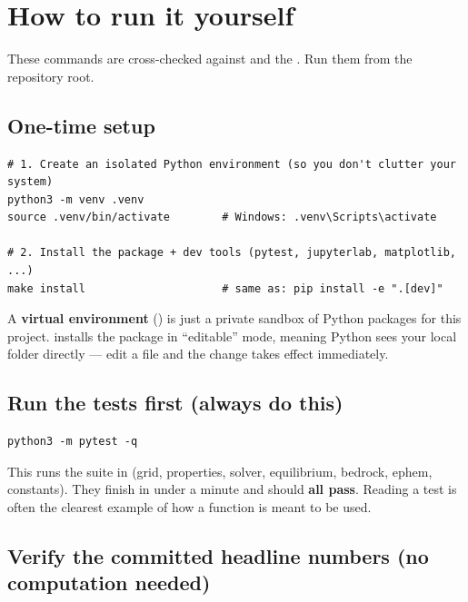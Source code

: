 \section{How to run it yourself}
\label{sec:running}

These commands are cross-checked against  and the
. Run them from the repository root.

\subsection{One-time setup}

\begin{lstlisting}[style=shellstyle,caption={Create an isolated environment and install the package.}]
# 1. Create an isolated Python environment (so you don't clutter your system)
python3 -m venv .venv
source .venv/bin/activate        # Windows: .venv\Scripts\activate

# 2. Install the package + dev tools (pytest, jupyterlab, matplotlib, ...)
make install                     # same as: pip install -e ".[dev]"
\end{lstlisting}

A \textbf{virtual environment} () is just a private sandbox of Python
packages for this project.  installs the 
package in ``editable'' mode, meaning Python sees your local  folder
directly --- edit a file and the change takes effect immediately.

\subsection{Run the tests first (always do this)}

\begin{lstlisting}[style=shellstyle]
python3 -m pytest -q
\end{lstlisting}

This runs the suite in  (grid, properties, solver, equilibrium,
bedrock, ephem, constants). They finish in under a minute and should
\textbf{all pass}. Reading a test is often the clearest example of how a function
is meant to be used.

\subsection{Verify the committed headline numbers (no computation needed)}

